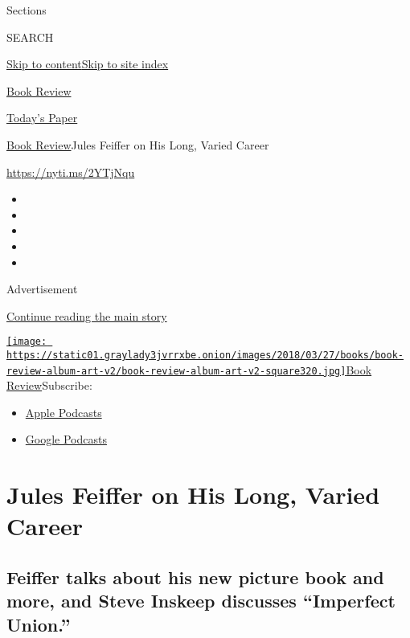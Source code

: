Sections

SEARCH

\protect\hyperlink{site-content}{Skip to
content}\protect\hyperlink{site-index}{Skip to site index}

\href{https://www.nytimes3xbfgragh.onion/section/books/review}{Book
Review}

\href{https://myaccount.nytimes3xbfgragh.onion/auth/login?response_type=cookie\&client_id=vi}{}

\href{https://www.nytimes3xbfgragh.onion/section/todayspaper}{Today's
Paper}

\href{/section/books/review}{Book Review}\textbar{}Jules Feiffer on His
Long, Varied Career

\url{https://nyti.ms/2YTjNqu}

\begin{itemize}
\item
\item
\item
\item
\item
\end{itemize}

Advertisement

\protect\hyperlink{after-top}{Continue reading the main story}

\href{https://www.nytimes3xbfgragh.onion/column/book-review-podcast}{\texttt{[image: https://static01.graylady3jvrrxbe.onion/images/2018/03/27/books/book-review-album-art-v2/book-review-album-art-v2-square320.jpg]}Book
Review}Subscribe:

\begin{itemize}
\tightlist
\item
  \href{https://itunes.apple.com/us/podcast/id120315179}{Apple Podcasts}
\item
  \href{https://www.google.com/podcasts?feed=aHR0cHM6Ly9yc3MuYXJ0MTkuY29tL2Jvb2stcmV2aWV3}{Google
  Podcasts}
\end{itemize}

\hypertarget{jules-feiffer-on-his-long-varied-career}{%
\section{Jules Feiffer on His Long, Varied
Career}\label{jules-feiffer-on-his-long-varied-career}}

\hypertarget{feiffer-talks-about-his-new-picture-book-and-more-and-steve-inskeep-discusses-imperfect-union}{%
\subsection{Feiffer talks about his new picture book and more, and Steve
Inskeep discusses ``Imperfect
Union.''}\label{feiffer-talks-about-his-new-picture-book-and-more-and-steve-inskeep-discusses-imperfect-union}}

